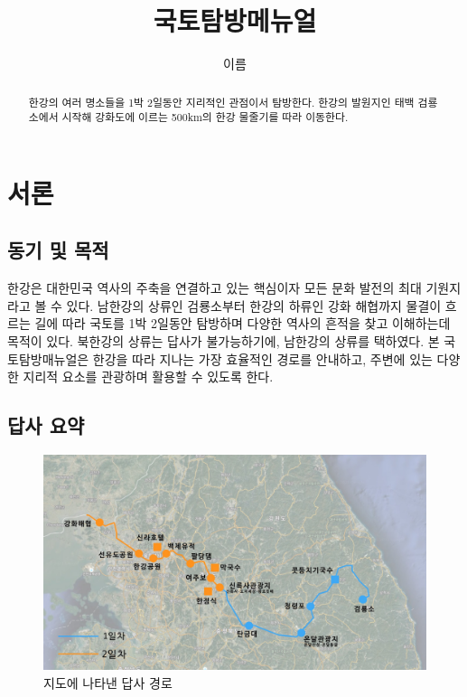 \documentclass[chapter, oneside]{oblivoir}
\title{국토탐방메뉴얼}
\author{이름}
\begin{document}
    \maketitle
    \begin{abstract}
    한강의 여러 명소들을 1박 2일동안 지리적인 관점이서 탐방한다.
    한강의 발원지인 태백 검룡소에서 시작해 강화도에 이르는 500km의 한강 물줄기를 따라 이동한다.
    

    \end{abstract}
    \newpage
    \tableofcontents

    \chapter{서론}
\section{동기 및 목적}
한강은 대한민국 역사의 주축을 연결하고 있는 핵심이자 모든 문화 발전의 최대 기원지라고 볼 수 있다.
남한강의 상류인 검룡소부터 한강의 하류인 강화 해협까지 물결이 흐르는 길에 따라 국토를 1박 2일동안 탐방하며 다양한 역사의 흔적을 찾고 이해하는데 목적이 있다.
 북한강의 상류는 답사가 불가능하기에, 남한강의 상류를 택하였다.
본 국토탐방매뉴얼은 한강을 따라 지나는 가장 효율적인 경로를 안내하고, 주변에 있는 다양한 지리적 요소를 관광하며 활용할 수 있도록 한다.

\section{답사 요약}
\begin{figure}[ht]
    \centering
    \includegraphics[width=1\textwidth]{img/전체-지도.jpg}
    \caption{지도에 나타낸 답사 경로\protect\footnotemark}
    \label{fig:path}
\end{figure}
\end{document}
